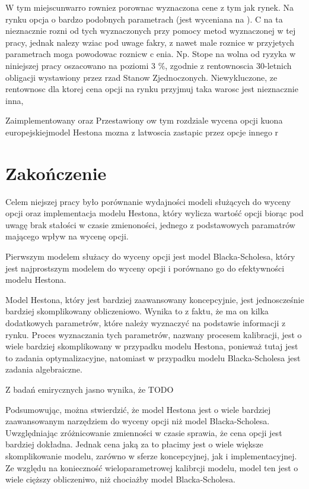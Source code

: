 \documentclass{pracamgr}
\begin{document}
W tym miejscunwarro rowniez porownac wyznaczona cene z tym jak rynek. Na rynku opcja o bardzo podobnych parametrach (jest wyceniana na ). C na ta nieznacznie rozni od tych wyznaczonych przy pomocy metod wyznaczonej w tej pracy, jednak nalezy wziac pod uwage fakry, z nawet male roznice w przyjetych parametrach moga powodowac roznicw c enia. Np. Stope na wolna od ryzyka w niniejszej pracy oszacowano na poziomi 3 $\%$, zgodnie z rentownoscia 30-letnich obligacji wystawiony przez rzad Stanow Zjednoczonych. Niewykluczone, ze rentownosc dla ktorej cena opcji na rynku przyjmuj taka warosc jest nieznacznie inna,


Zaimplementowany oraz Przestawiony ow tym rozdziale wycena opcji kuona europejskiejmodel Hestona mozna z latwoscia zastapic przez opcje innego r


 \chapter*{Zakończenie}\label{r:ending}

Celem niejszej pracy było porównanie wydajności modeli służących do wyceny
opcji oraz implementacja modelu Hestona, który wylicza wartość opcji biorąc
pod uwagę brak stałości w czasie zmienoności, jednego z podstawowych paramatrów
mającego wpływ na wycenę opcji. 

Pierwszym modelem służacy do wyceny opcji jest model Blacka-Scholesa, który jest
najprostszym modelem do wyceny opcji i porównano go do efektywności modelu 
Hestona. 

Model Hestona, który jest bardziej zaawansowany koncepcyjnie, jest jednoscześnie 
bardziej skomplikowany obliczeniowo. Wynika to z faktu, że ma on kilka dodatkowych
parametrów, które należy wyznaczyć na podstawie informacji z rynku. Proces wyznaczania tych 
parametrów, nazwany procesem kalibracji, jest o wiele bardziej skomplikowany w przypadku 
modelu Hestona, ponieważ tutaj jest to zadania optymalizacyjne, natomiast w przypadku modelu
Blacka-Scholesa jest zadania algebraiczne.


Z badań emirycznych jasno wynika, że TODO


Podsumowując, można stwierdzić, że model Hestona jest o wiele bardziej zaawansowanym
narzędziem do wyceny opcji niż model Blacka-Scholesa. Uwzględniając zróżnicowanie zmienności 
w czasie sprawia, że cena opcji jest bardziej dokładna. Jednak cena jaką za to płacimy 
jest o wiele większe skomplikowanie modelu, zarówno w sferze koncepcyjnej, jak i 
implementacyjnej. Ze względu na konieczność wieloparametrowej kalibrcji modelu, 
model ten jest o wiele cięższy obliczeniwo, niż chociażby model Blacka-Scholesa.
\end{document}
